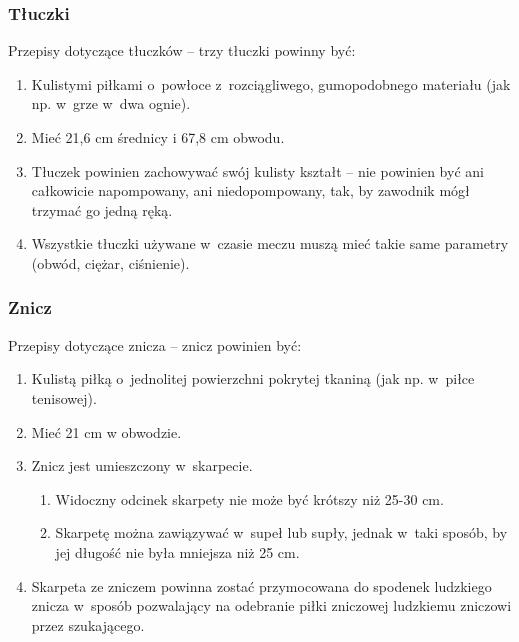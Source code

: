 \documentclass[12pt,a4paper]{article}
\begin{document}
\subsubsection{Tłuczki}
Przepisy dotyczące tłuczków -- trzy tłuczki powinny być:

\begin{enumerate}
	\item Kulistymi piłkami o~powłoce z~rozciągliwego, gumopodobnego materiału
	      (jak np. w~grze w~dwa ognie).

	\item Mieć 21,6 cm średnicy i 67,8 cm obwodu.

	\item Tłuczek powinien zachowywać swój kulisty kształt -- nie powinien być
	      ani całkowicie napompowany, ani niedopompowany, tak, by zawodnik mógł
	      trzymać go jedną ręką.

	\item Wszystkie tłuczki używane w~czasie meczu muszą mieć takie same
	      parametry (obwód, ciężar, ciśnienie).
\end{enumerate}

\subsubsection{Znicz}
Przepisy dotyczące znicza -- znicz powinien być:

\begin{enumerate}
	\item Kulistą piłką o~jednolitej powierzchni pokrytej tkaniną (jak np. w~piłce tenisowej).

	\item Mieć 21 cm w obwodzie.

	\item Znicz jest umieszczony w~skarpecie.
	      \begin{enumerate}
		      \item Widoczny odcinek skarpety nie może być krótszy niż 25-30 cm.

		      \item Skarpetę można zawiązywać w~supeł lub supły, jednak w~taki sposób,
		            by jej długość nie była mniejsza niż 25 cm.
	      \end{enumerate}
	\item Skarpeta ze zniczem powinna zostać przymocowana do spodenek ludzkiego
	      znicza w~sposób pozwalający na odebranie piłki zniczowej ludzkiemu
	      zniczowi przez szukającego.
\end{enumerate}
\end{document}
